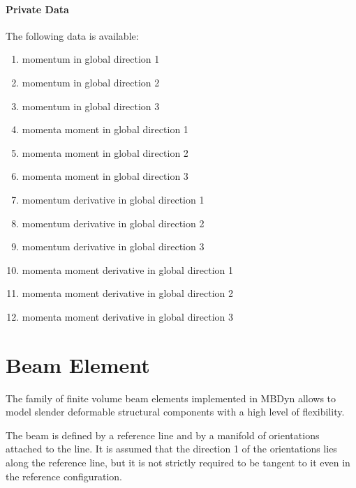\paragraph{Private Data}
The following data is available:
\begin{enumerate}
\item {} momentum in global direction 1
\item {} momentum in global direction 2
\item {} momentum in global direction 3
\item {} momenta moment in global direction 1
\item {} momenta moment in global direction 2
\item {} momenta moment in global direction 3
\item {} momentum derivative in global direction 1
\item {} momentum derivative in global direction 2
\item {} momentum derivative in global direction 3
\item {} momenta moment derivative in global direction 1
\item {} momenta moment derivative in global direction 2
\item {} momenta moment derivative in global direction 3
\end{enumerate}





\section{Beam Element}
\label{sec:EL:BEAM}
The family of finite volume beam elements implemented in MBDyn
allows to model slender deformable structural components 
with a high level of flexibility.

\noindent
The beam is defined by a reference line and by a manifold
of orientations attached to the line.
It is assumed that the direction 1 of the orientations lies along
the reference line, but it is not strictly required to be tangent
to it even in the reference configuration.


